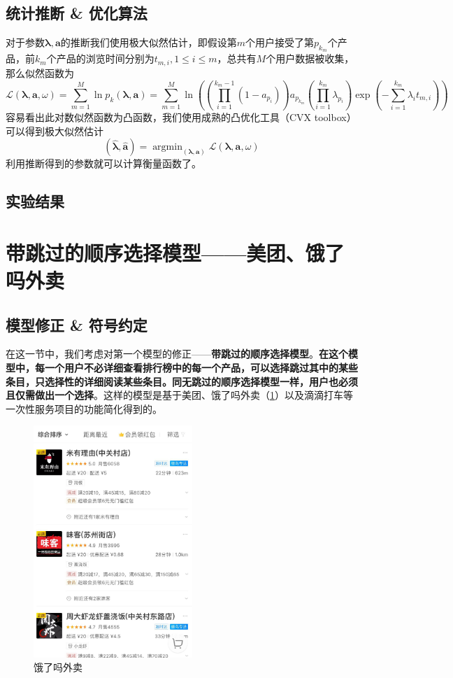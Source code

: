 \documentclass[UTF8]{ctexart}
\theoremstyle{plain}
\theoremstyle{definition}
\theoremstyle{remark}
\DeclareMathOperator*{\argmin}{argmin}
\begin{document}
	\subsection{统计推断 \& 优化算法}
	对于参数$\bm{\lambda}, \bm{a}$的推断我们使用极大似然估计，即假设第$m$个用户接受了第$p_{k_m}$个产品，前$k_m$个产品的浏览时间分别为$t_{m,i}, 1 \leq i \leq m$，总共有$M$个用户数据被收集，那么似然函数为
	\begin{equation}
	\mathcal{L}\left(\bm{\lambda}, \bm{a}, \omega\right) = \sum_{m=1}^M \ln p_k(\bm{\lambda}, \bm{a}) = \sum_{m=1}^M \ln \left(\left(\prod_{i=1}^{k_m-1}(1-a_{p_i})\right)a_{p_{k_m}}\left(\prod_{i=1}^{k_m} \lambda_{p_i}\right)\exp\left(-\sum_{i=1}^{k_m}\lambda_i t_{m,i}\right)\right)
	\end{equation}
	容易看出此对数似然函数为凸函数，我们使用成熟的凸优化工具（CVX toolbox）可以得到极大似然估计
	$$
	\left(\bm{\hat{\lambda}}, \bm{\hat{a}}\right) = \argmin_{\left(\bm{\lambda}, \bm{a}\right)} \mathcal{L}\left(\bm{\lambda}, \bm{a}, \omega\right)
	$$
	利用推断得到的参数就可以计算衡量函数了。
	\subsection{实验结果}
	\section{带跳过的顺序选择模型——美团、饿了吗外卖}
	\subsection{模型修正 \& 符号约定}
	在这一节中，我们考虑对第一个模型的修正——\textbf{带跳过的顺序选择模型}。\textbf{在这个模型中，每一个用户不必详细查看排行榜中的每一个产品，可以选择跳过其中的某些条目，只选择性的详细阅读某些条目。同无跳过的顺序选择模型一样，用户也必须且仅需做出一个选择}。这样的模型是基于美团、饿了吗外卖（\ref{modelB_fig_1}）以及滴滴打车等一次性服务项目的功能简化得到的。
	\begin{figure}[h!] 
		\centering
		\includegraphics[width = 6cm]{modelB_fig_1.jpg}
		\caption{饿了吗外卖}\label{modelB_fig_1}
	\end{figure}
	
\end{document}

